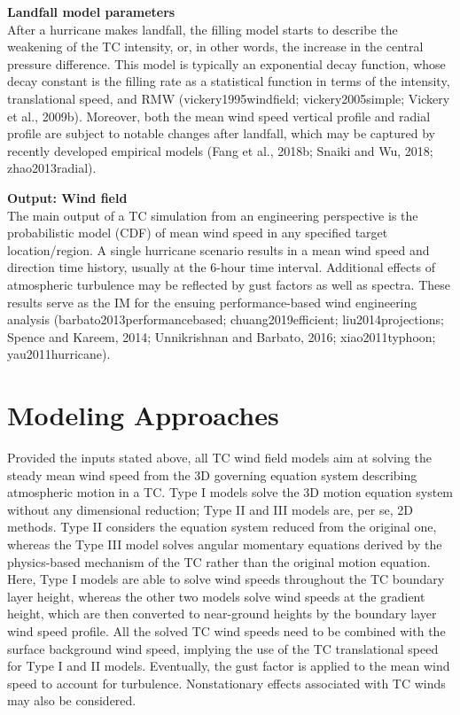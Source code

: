 \noindent\textbf{Landfall model parameters} \\After a hurricane makes landfall, the filling model starts to describe the weakening of the TC intensity, or, in other words, the increase in the central pressure difference. This model is typically an exponential decay function, whose decay constant is the filling rate as a statistical function in terms of the intensity, translational speed, and RMW (vickery1995windfield; vickery2005simple; Vickery et al., 2009b). Moreover, both the mean wind speed vertical profile and radial profile are subject to notable changes after landfall, which may be captured by recently developed empirical models (Fang et al., 2018b; Snaiki and Wu, 2018; zhao2013radial). 
\newline

\noindent\textbf{Output: Wind field} \\The main output of a TC simulation from an engineering perspective is the probabilistic model (CDF) of mean wind speed in any specified target location/region. A single hurricane scenario results in a mean wind speed and direction time history, usually at the 6-hour time interval. Additional effects of atmospheric turbulence may be reflected by gust factors as well as spectra. These results serve as the IM for the ensuing performance-based wind engineering analysis (barbato2013performancebased; chuang2019efficient; liu2014projections; Spence and Kareem, 2014; Unnikrishnan and Barbato, 2016; xiao2011typhoon; yau2011hurricane).

\section{Modeling Approaches}
\label{sec:storm_wind_methods}

Provided the inputs stated above, all TC wind field models aim at solving the steady mean wind speed from the 3D governing equation system describing atmospheric motion in a TC. Type I models solve the 3D motion equation system without any dimensional reduction; Type II and III models are, per se, 2D methods. Type II considers the equation system reduced from the original one, whereas the Type III model solves angular momentary equations derived by the physics-based mechanism of the TC rather than the original motion equation. Here, Type I models are able to solve wind speeds throughout the TC boundary layer height, whereas the other two models solve wind speeds at the gradient height, which are then converted to near-ground heights by the boundary layer wind speed profile. All the solved TC wind speeds need to be combined with the surface background wind speed, implying the use of the TC translational speed for Type I and II models. Eventually, the gust factor is applied to the mean wind speed to account for turbulence. Nonstationary effects associated with TC winds may also be considered.
\newline

